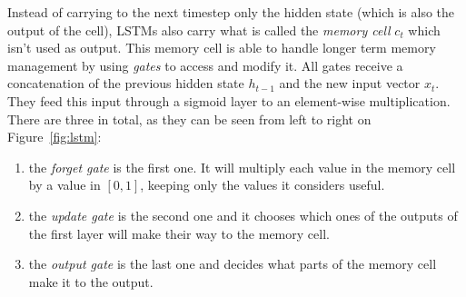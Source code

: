 Instead of carrying to the next timestep only the hidden state (which is also
the output of the cell), LSTMs also carry what is called the
\textit{memory cell} $c_t$ which isn't used as output. This memory cell is 
able to handle longer term memory management by using \textit{gates} to 
access and modify it. All gates receive a concatenation of the previous hidden
state $h_{t-1}$ and the new input vector $x_t$. They feed this input through a
sigmoid layer to an element-wise multiplication. There are three in total, as
they can be seen from left to right on Figure~\ref{fig:lstm}:
\begin{enumerate}
	\item the \textit{forget gate} is the first one. It will multiply each
		value in the memory cell by a value in $[0, 1]$, keeping only
		the values it considers useful.
	\item the \textit{update gate} is the second one and it chooses which
		ones of the outputs of the first  layer will
		make their way to the memory cell.
	\item the \textit{output gate} is the last one and decides what parts
		of the memory cell make it to the output.
\end{enumerate}



